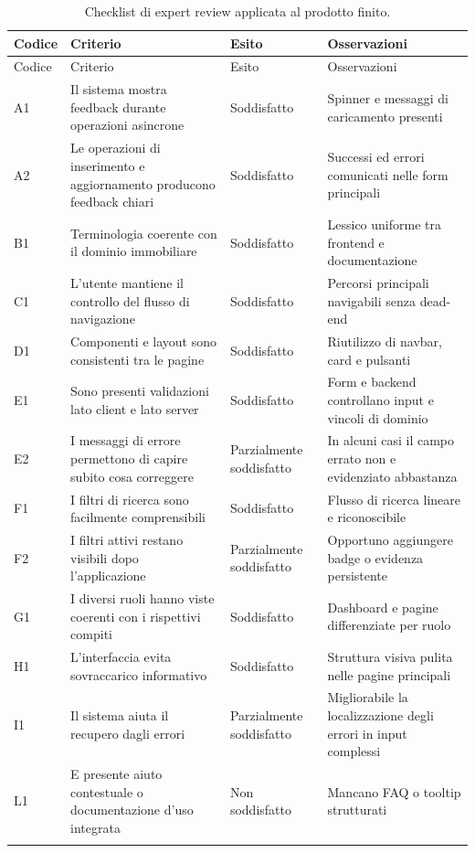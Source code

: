 \documentclass[a4paper,11pt]{article}
\begin{document}
\begin{longtable}{@{}p{}p{}p{}p{}@{}}
\toprule
Codice & Criterio & Esito & Osservazioni \\
\midrule
\endfirsthead
\toprule
Codice & Criterio & Esito & Osservazioni \\
\midrule
\endhead
A1 & Il sistema mostra feedback durante operazioni asincrone & Soddisfatto & Spinner e messaggi di caricamento presenti \\
A2 & Le operazioni di inserimento e aggiornamento producono feedback chiari & Soddisfatto & Successi ed errori comunicati nelle form principali \\
B1 & Terminologia coerente con il dominio immobiliare & Soddisfatto & Lessico uniforme tra frontend e documentazione \\
C1 & L'utente mantiene il controllo del flusso di navigazione & Soddisfatto & Percorsi principali navigabili senza dead-end \\
D1 & Componenti e layout sono consistenti tra le pagine & Soddisfatto & Riutilizzo di navbar, card e pulsanti \\
E1 & Sono presenti validazioni lato client e lato server & Soddisfatto & Form e backend controllano input e vincoli di dominio \\
E2 & I messaggi di errore permettono di capire subito cosa correggere & Parzialmente soddisfatto & In alcuni casi il campo errato non e evidenziato abbastanza \\
F1 & I filtri di ricerca sono facilmente comprensibili & Soddisfatto & Flusso di ricerca lineare e riconoscibile \\
F2 & I filtri attivi restano visibili dopo l'applicazione & Parzialmente soddisfatto & Opportuno aggiungere badge o evidenza persistente \\
G1 & I diversi ruoli hanno viste coerenti con i rispettivi compiti & Soddisfatto & Dashboard e pagine differenziate per ruolo \\
H1 & L'interfaccia evita sovraccarico informativo & Soddisfatto & Struttura visiva pulita nelle pagine principali \\
I1 & Il sistema aiuta il recupero dagli errori & Parzialmente soddisfatto & Migliorabile la localizzazione degli errori in input complessi \\
L1 & E presente aiuto contestuale o documentazione d'uso integrata & Non soddisfatto & Mancano FAQ o tooltip strutturati \\
\bottomrule
\caption{Checklist di expert review applicata al prodotto finito.}
\label{tab:checklist}
\end{longtable}
\end{document}

